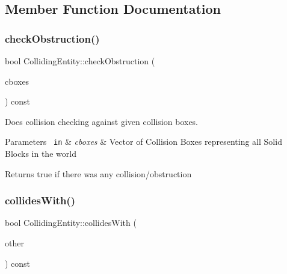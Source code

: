 \subsection{Member Function Documentation}
\mbox{\label{class_colliding_entity_a62cd7977ea32bbc4665fcc498c1ade2e}} 
\subsubsection{\texorpdfstring{checkObstruction()}{checkObstruction()}}
{\footnotesize\ttfamily bool Colliding\+Entity\+::check\+Obstruction (\begin{DoxyParamCaption}\item[{const std\+::vector$<$ \mbox{\hyperlink{class_collision_box}{Collision\+Box}} $>$ \&}]{cboxes }\end{DoxyParamCaption}) const\hspace{0.3cm}{\ttfamily [inline]}}



Does collision checking against given collision boxes. 


\begin{DoxyParams}[1]{Parameters}
\mbox{\texttt{ in}}  & {\em cboxes} & Vector of Collision Boxes representing all Solid Blocks in the world\\
\hline
\end{DoxyParams}
\begin{DoxyReturn}{Returns}
true if there was any collision/obstruction 
\end{DoxyReturn}
\mbox{\label{class_colliding_entity_abb29e39718af974740d80e4a03251c8d}} 
\subsubsection{\texorpdfstring{collidesWith()}{collidesWith()}\hspace{0.1cm}{\footnotesize\ttfamily [1/2]}}
{\footnotesize\ttfamily bool Colliding\+Entity\+::collides\+With (\begin{DoxyParamCaption}\item[{const \mbox{\hyperlink{class_colliding_entity}{Colliding\+Entity}} \&}]{other }\end{DoxyParamCaption}) const\hspace{0.3cm}{\ttfamily [inline]}}



